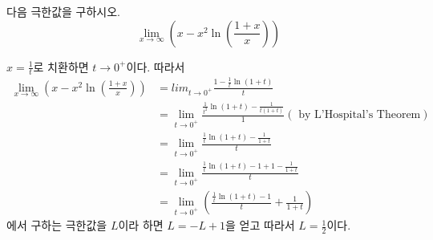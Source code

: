 \documentclass[11pt, a4paper]{book}
\begin{document}
\vspace{1em}
\begin{example}\label{exam:rev_trans}
	다음 극한값을 구하시오.
	\begin{equation*}
	\displaystyle\lim_{x\to\infty}\left(x - x^{2}\ln\left(\frac{1+x}{x}\right)\right)
	\end{equation*}
\begin{solution}
	$x =\frac{1}{t}$로 치환하면 $t\to 0^{+}$이다. 따라서
	\begin{align*}
		\lim_{x\to\infty}\left(x - x^{2}\ln\left(\frac{1+x}{x}\right)\right)
		& =lim_{t\to 0^{+}}\frac{1-\frac{1}{t}\ln(1+t)}{t}\\
		& =\lim_{t\to 0^{+}}\frac{\frac{1}{t^{2}}\ln(1+t)-\frac{1}{t(1+t)}}{1}(\text{ by L'Hospital's Theorem})\\
		& =\lim_{t\to 0^{+}}\frac{\frac{1}{t}\ln(1+t)-\frac{1}{1+t}}{t}\\
		& =\lim_{t\to 0^{+}}\frac{\frac{1}{t}\ln(1+t)-1 + 1-\frac{1}{1+t}}{t}\\
		& =\lim_{t\to 0^{+}}\left(\frac{\frac{1}{t}\ln(1+t)-1}{t}+\frac{1}{1+t}\right)
	\end{align*}
	에서 구하는 극한값을 $L$이라 하면 $L = -L + 1$을 얻고 따라서 $L =\frac{1}{2}$이다.
\end{solution}
\end{example}
\vspace{1em}
\end{document}

